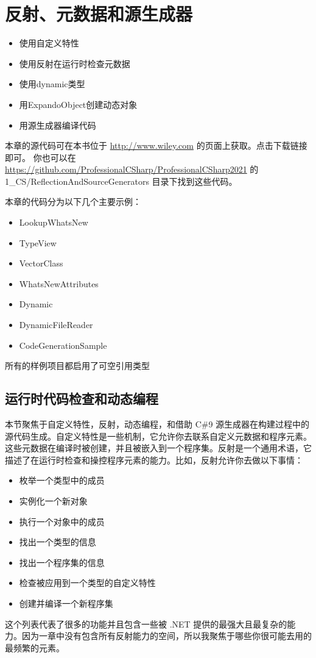 \chapter{反射、元数据和源生成器}
\underline{}
\begin{itemize}
    \item 使用自定义特性
    \item 使用反射在运行时检查元数据
    \item 使用dynamic类型
    \item 用ExpandoObject创建动态对象
    \item 用源生成器编译代码
\end{itemize}

\underline{}

本章的源代码可在本书位于 \url{http://www.wiley.com} 的页面上获取。点击下载链接即可。
你也可以在 \url{https://github.com/ProfessionalCSharp/ProfessionalCSharp2021} 的 1\_CS/ReflectionAndSourceGenerators 目录下找到这些代码。

本章的代码分为以下几个主要示例：
\begin{itemize}
    \item LookupWhatsNew
    \item TypeView
    \item VectorClass
    \item WhatsNewAttributes
    \item Dynamic
    \item DynamicFileReader
    \item CodeGenerationSample
\end{itemize}
所有的样例项目都启用了可空引用类型

\section{运行时代码检查和动态编程}
本节聚焦于自定义特性，反射，动态编程，和借助 C\#9 源生成器在构建过程中的源代码生成。自定义特性是一些机制，它允许你去联系自定义元数据和程序元素。这些元数据在编译时被创建，并且被嵌入到一个程序集。反射是一个通用术语，它描述了在运行时检查和操控程序元素的能力。比如，反射允许你去做以下事情：
\begin{itemize}
    \item 枚举一个类型中的成员
    \item 实例化一个新对象
    \item 执行一个对象中的成员
    \item 找出一个类型的信息
    \item 找出一个程序集的信息
    \item 检查被应用到一个类型的自定义特性
    \item 创建并编译一个新程序集
\end{itemize}
这个列表代表了很多的功能并且包含一些被 .NET 提供的最强大且最复杂的能力。因为一章中没有包含所有反射能力的空间，所以我聚焦于哪些你很可能去用的最频繁的元素。

